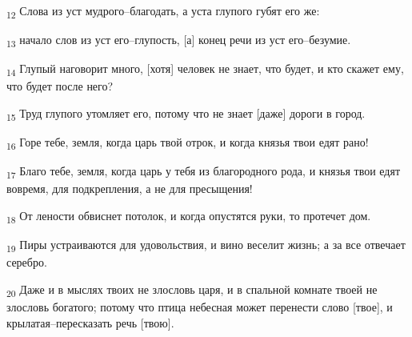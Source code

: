 \begin{tcolorbox}
\textsubscript{12} Слова из уст мудрого--благодать, а уста глупого губят его же:
\end{tcolorbox}
\begin{tcolorbox}
\textsubscript{13} начало слов из уст его--глупость, [а] конец речи из уст его--безумие.
\end{tcolorbox}
\begin{tcolorbox}
\textsubscript{14} Глупый наговорит много, [хотя] человек не знает, что будет, и кто скажет ему, что будет после него?
\end{tcolorbox}
\begin{tcolorbox}
\textsubscript{15} Труд глупого утомляет его, потому что не знает [даже] дороги в город.
\end{tcolorbox}
\begin{tcolorbox}
\textsubscript{16} Горе тебе, земля, когда царь твой отрок, и когда князья твои едят рано!
\end{tcolorbox}
\begin{tcolorbox}
\textsubscript{17} Благо тебе, земля, когда царь у тебя из благородного рода, и князья твои едят вовремя, для подкрепления, а не для пресыщения!
\end{tcolorbox}
\begin{tcolorbox}
\textsubscript{18} От лености обвиснет потолок, и когда опустятся руки, то протечет дом.
\end{tcolorbox}
\begin{tcolorbox}
\textsubscript{19} Пиры устраиваются для удовольствия, и вино веселит жизнь; а за все отвечает серебро.
\end{tcolorbox}
\begin{tcolorbox}
\textsubscript{20} Даже и в мыслях твоих не злословь царя, и в спальной комнате твоей не злословь богатого; потому что птица небесная может перенести слово [твое], и крылатая--пересказать речь [твою].
\end{tcolorbox}
